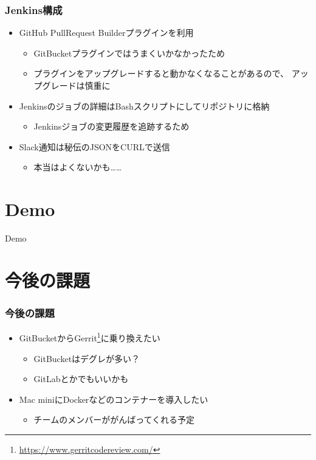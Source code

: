 \begin{frame}
  \frametitle{Jenkins構成}
  
  \begin{itemize}
    \item<1-> GitHub PullRequest Builderプラグインを利用
    \begin{itemize}
      \item GitBucketプラグインではうまくいかなかったため
      \item プラグインをアップグレードすると動かなくなることがあるので、
      アップグレードは慎重に
    \end{itemize}

    \item<2-> Jenkinsのジョブの詳細はBashスクリプトにしてリポジトリに格納
    \begin{itemize}
      \item Jenkinsジョブの変更履歴を追跡するため
    \end{itemize}

    \item<3-> Slack通知は秘伝のJSONをCURLで送信
    \begin{itemize}
      \item 本当はよくないかも……
    \end{itemize}
  \end{itemize}
\end{frame}

\section{Demo}

\begin{frame}
  \centering
  {\Huge Demo}
\end{frame}

\section{今後の課題}

\begin{frame}
  \frametitle{今後の課題}

  \begin{itemize}
    \item<2-> GitBucketからGerrit\footnote[frame]{\url{https://www.gerritcodereview.com/}}に乗り換えたい
    \begin{itemize}
      \item GitBucketはデグレが多い？
      \item GitLabとかでもいいかも
    \end{itemize}
     
    \item<3-> Mac miniにDockerなどのコンテナーを導入したい
    \begin{itemize}
      \item チームのメンバーががんばってくれる予定
    \end{itemize}
  \end{itemize}
\end{frame}

